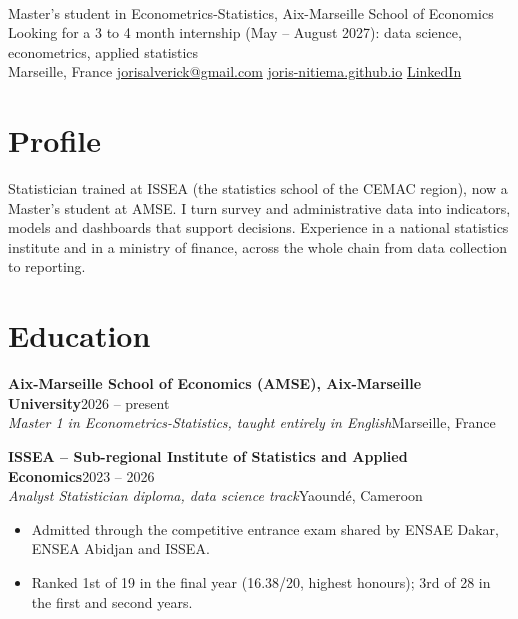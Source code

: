 \documentclass[10pt,a4paper]{article}
\newcommand{\entry}[4]{\textbf{#1}\hfill{\small\color{muted}#2}\\{\itshape #3}\hfill{\small\color{muted}#4}\par}
\newcommand{\lnk}[2]{\href{#1}{\color{olive}#2}}
\begin{document}
{\\[3pt]
{\sffamily Master's student in Econometrics-Statistics, Aix-Marseille School of Economics}\\[2pt]
{\sffamily\small\color{olive} Looking for a 3 to 4 month internship (May -- August 2027): data science, econometrics, applied statistics}\\[3pt]
{\small Marseille, France \;\textbar\; \lnk{mailto:jorisalverick@gmail.com}{jorisalverick@gmail.com} \;\textbar\; \lnk{https://joris-nitiema.github.io}{joris-nitiema.github.io} \;\textbar\; \lnk{https://www.linkedin.com/in/joris-alverick-nitiema-67b8a4333/}{LinkedIn}}\par}

\section{Profile}
Statistician trained at ISSEA (the statistics school of the CEMAC region), now a Master's student at AMSE. I turn survey and administrative data into indicators, models and dashboards that support decisions. Experience in a national statistics institute and in a ministry of finance, across the whole chain from data collection to reporting.

\section{Education}
\entry{Aix-Marseille School of Economics (AMSE), Aix-Marseille University}{2026 -- present}{Master 1 in Econometrics-Statistics, taught entirely in English}{Marseille, France}
\vspace{3pt}
\entry{ISSEA -- Sub-regional Institute of Statistics and Applied Economics}{2023 -- 2026}{Analyst Statistician diploma, data science track}{Yaound\'e, Cameroon}
\begin{itemize}
\item Admitted through the competitive entrance exam shared by ENSAE Dakar, ENSEA Abidjan and ISSEA.
\item Ranked 1st of 19 in the final year (16.38/20, highest honours); 3rd of 28 in the first and second years.
\end{itemize}
\end{document}
